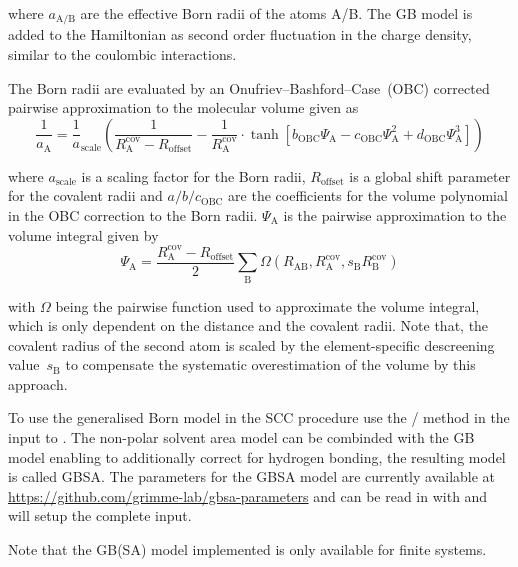 where $a_\text{A/B}$ are the effective Born radii of the atoms A/B.
The GB model is added to the Hamiltonian as second order fluctuation
in the charge density, similar to the coulombic interactions.

The Born radii are evaluated by an Onufriev--Bashford--Case~(OBC) corrected
pairwise approximation to the molecular volume given as
%
\begin{equation}
  \frac1{a_\text{A}} = \frac1a_\text{scale}\left(
  \frac1{R^\text{cov}_\text{A} - R_\text{offset}}
  - \frac1{R^\text{cov}_\text{A}}
  \cdot \tanh\left[b_\text{OBC}\Psi_\text{A}
  - c_\text{OBC}\Psi_\text{A}^2 + d_\text{OBC}\Psi_\text{A}^3\right]
  \right)
\end{equation}

where $a_\text{scale}$ is a scaling factor for the Born radii,
$R_\text{offset}$ is a global shift parameter for the covalent radii and
$a/b/c_\text{OBC}$ are the coefficients for the volume polynomial in
the OBC correction to the Born radii.
$\Psi_\text{A}$ is the pairwise approximation to the volume integral
given by
%
\begin{equation}
  \Psi_\text{A} = \frac{R^\text{cov}_\text{A} - R_\text{offset}}2
  \sum_\text{B} \Omega(R_\text{AB}, R^\text{cov}_\text{A}, s_\text{B}R^\text{cov}_\text{B})
\end{equation}

with $\Omega$ being the pairwise function used to approximate the
volume integral, which is only dependent on the distance and the
covalent radii. Note that, the covalent radius of the second atom
is scaled by the element-specific descreening value~$s_\text{B}$
to compensate the systematic overestimation of the volume by this
approach.

To use the generalised Born model in the SCC procedure use the
 /  method in the input to .
The non-polar solvent area model can be combinded with the GB model
enabling to additionally correct for hydrogen bonding, the resulting
model is called GBSA.
The parameters for the GBSA model are currently available at
\url{https://github.com/grimme-lab/gbsa-parameters} and can be read in with
 and will setup the complete  input.

Note that the GB(SA) model implemented is only available for finite
systems.

